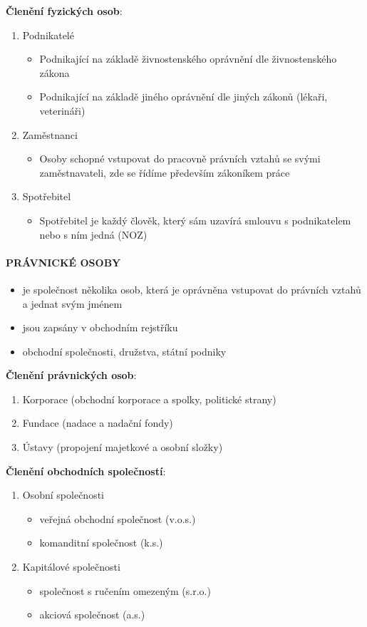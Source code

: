\documentclass[11pt,a4paper,twoside]{book}
\begin{document}
\textbf{Členění fyzických osob}:
\begin{enumerate}
	\item Podnikatelé
		\begin{itemize}
			\item Podnikající na základě živnostenského oprávnění dle živnostenského zákona
			\item Podnikající na základě jiného oprávnění dle jiných zákonů (lékaři, veterináři)
		\end{itemize}
	\item Zaměstnanci
		\begin{itemize}
			\item Osoby schopné vstupovat do pracovně právních vztahů se svými zaměstnavateli, zde se řídíme především zákoníkem práce
		\end{itemize}
	\item Spotřebitel
		\begin{itemize}
			\item Spotřebitel je každý člověk, který sám uzavírá smlouvu s podnikatelem nebo s ním jedná (NOZ)
		\end{itemize}
\end{enumerate}

\paragraph*{PRÁVNICKÉ OSOBY}
\begin{itemize}
	\item je společnost několika osob, která je oprávněna vstupovat do právních vztahů a jednat svým jménem
	\item jsou zapsány v obchodním rejstříku
	\item obchodní společnosti, družstva, státní podniky
\end{itemize}

\textbf{Členění právnických osob}:
\begin{enumerate}
	\item Korporace (obchodní korporace a spolky, politické strany)
	\item Fundace (nadace a nadační fondy)
	\item Ústavy (propojení majetkové a osobní složky)
\end{enumerate}

\textbf{Členění obchodních společností}:
\begin{enumerate}
	\item Osobní společnosti
		\begin{itemize}
			\item veřejná obchodní společnost (v.o.s.)
			\item komanditní společnost (k.s.)
		\end{itemize}
	\item Kapitálové společnosti
		\begin{itemize}
			\item společnost s ručením omezeným (s.r.o.)
			\item akciová společnost (a.s.)
		\end{itemize}
\end{enumerate}
\end{document}
